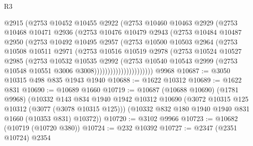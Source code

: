 \begin{lexlean}{R3}
\begin{coremodule}
                      @2915
                      (@2753
                        @10452
                        @10455
                        @2922
                        (@2753
                          @10460
                          @10463
                          @2929
                          (@2753
                            @10468
                            @10471
                            @2936
                            (@2753
                              @10476
                              @10479
                              @2943
                              (@2753
                                @10484
                                @10487
                                @2950
                                (@2753
                                  @10492
                                  @10495
                                  @2957
                                  (@2753
                                    @10500
                                    @10503
                                    @2964
                                    (@2753
                                      @10508
                                      @10511
                                      @2971
                                      (@2753
                                        @10516
                                        @10519
                                        @2978
                                        (@2753
                                          @10524
                                          @10527
                                          @2985
                                          (@2753
                                            @10532
                                            @10535
                                            @2992
                                            (@2753
                                              @10540
                                              @10543
                                              @2999
                                              (@2753 @10548 @10551 @3006 @3008))))))))))))))))))))))
    @9968
@10687 := @3050 @10315 @498 @835 @1943 @1940
@10688 := @1622 @10312
@10689 := @1622 @831
@10690 := @10689 @1660
@10719 := @10687
    (@10688 @10690)
    (@1781 @9968)
    (@10332
      @143
      @834
      @1940
      @1942
      @10312
      @10690
      (@3072 @10315 @125 @10312 (@3077 (@3078 @10315 @125)))
      (@10332 @832 @180 @1940 @1940 @831 @1660 (@10353 @831) @10372))
@10720 := @3102 @9966
@10723 := @10682 (@10719 (@10720 @380))
@10724 := @232 @10392
@10727 := @2347 (@2351 @10724) @2354

\end{coremodule}
\end{lexlean}
